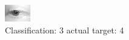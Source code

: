 \begin{figure}[h!]
\begin{center}
\includegraphics[width=0.60\columnwidth]{figures/ID2591_class_3_target_4.png}
\end{center}
\caption{ Classification: 3 actual target: 4}
\label{fig:ID2591_class_3_target_4}
\end{figure}
